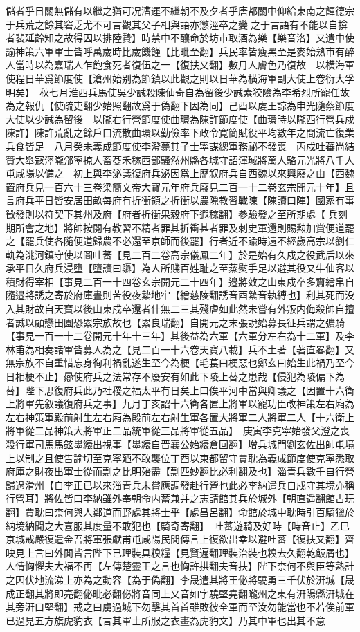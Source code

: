 儲者乎日關無儲有以繼之猶可况漕運不繼朝不及夕者乎唐都關中仰給東南之餫德宗于兵荒之餘其窘乏尤不可言觀其父子相與語亦懲涇卒之變之于言語有不能以自揜者裴延齡知之故得因以排陸贄】時禁中不釀命於坊市取酒為樂【樂音洛】又遣中使諭神策六軍軍士皆呼萬歲時比歲饑饉【比毗至翻】兵民率皆瘦黑至是麥始熟市有醉人當時以為嘉瑞人乍飽食死者復伍之一【復扶又翻】數月人膚色乃復故　以横海軍使程日華爲節度使【滄州始别為節鎮以此觀之則以日華為横海軍副大使上卷衍大孚明矣】　秋七月淮西兵馬使吳少誠殺陳仙奇自為留後少誠素狡險為李希烈所寵任故為之報仇【使疏吏翻少始照翻故爲于偽翻下因為同】己酉以䖍王諒為申光隨蔡節度大使以少誠為留後　以隴右行營節度使曲環為陳許節度使【曲環時以隴西行營兵戍陳許】陳許荒亂之餘戶口流散曲環以勤儉率下政令寛簡賦役平均數年之間流亡復業兵食皆足　八月癸未義成節度使李澄薨其子士寜謀總軍務祕不發喪　丙戍吐蕃尚結贊大舉寇涇隴邠寜掠人畜芟禾稼西鄙騷然州縣各城守詔渾瑊將萬人駱元光將八千人屯咸陽以備之　初上與李泌議復府兵泌因爲上歷叙府兵自西魏以來興廢之由【西魏置府兵見一百六十三卷梁簡文帝大寶元年府兵廢見二百一十二卷玄宗開元十年】且言府兵平日皆安居田畝每府有折衝領之折衝以農隙教習戰陳【陳讀曰陣】國家有事徵發則以符契下其州及府【府者折衝果毅府下遐稼翻】參驗發之至所期處【兵刻期所會之地】將帥按閱有教習不精者罪其折衝甚者罪及刺史軍還則賜勲加賞便道罷之【罷兵使各隨便道歸農不必還至京師而後罷】行者近不踰時遠不經歲高宗以劉仁軌為洮河鎮守使以圖吐蕃【見二百二卷高宗儀鳳二年】於是始有久戍之役武后以來承平日久府兵浸墮【墮讀曰隳】為人所賤百姓耻之至蒸熨手足以避其役又牛仙客以積財得宰相【事見二百一十四卷玄宗開元二十四年】邉將效之山東戍卒多齎繒帛自隨邉將誘之寄於府庫晝則苦役夜縶地牢【繒慈陵翻誘音酉縶音執縛也】利其死而没入其財故自天寶以後山東戍卒還者什無二三其殘虐如此然未嘗有外叛内侮殺帥自擅者誠以顧戀田園恐累宗族故也【累良瑞翻】自開元之末張說始募長征兵謂之彍騎【事見一百一十二卷開元十年十三年】其後益為六軍【六軍分左右為十二軍】及李林甫為相奏諸軍皆募人為之【見二百一十六卷天寶八載】兵不土著【著直畧翻】又無宗族不自重惜忘身徇利禍亂遂生至今為梗【毛萇曰梗惡也鄭玄曰始生此禍乃至今日相梗不止】曏使府兵之法常存不廢安有如此下陵上替之患哉【侵犯為陵偏下為替】陛下思復府兵此乃社稷之福太平有日矣上曰俟平河中當與卿議之【因置十六衛上將軍先叙議復府兵之事】九月丁亥詔十六衛各置上將軍以寵功臣改神策左右廂為左右神策軍殿前射生左右廂為殿前左右射生軍各置大將軍二人將軍二人【十六衛上將軍從二品神策大將軍正二品統軍從三品將軍從五品】　庚寅李克寜始發父澄之喪殺行軍司馬馬鉉墨縗出視事【墨縗自晋襄公始縗倉回翻】增兵城門劉玄佐出師屯境上以制之且使告諭切至克寜廼不敢襲位丁酉以東都留守賈耽為義成節度使克寜悉取府庫之財夜出軍士從而剽之比明殆盡【剽匹妙翻比必利翻及也】淄青兵數千自行營歸過滑州【自李正已以來淄青兵未嘗應調發赴行營也此必李納遣兵自戍守其境亦稱行營耳】將佐皆曰李納雖外奉朝命内蓄兼并之志請館其兵於城外【朝直遥翻館古玩翻】賈耽曰柰何與人鄰道而野處其將士乎【處昌呂翻】命館於城中耽時引百騎獵於納境納聞之大喜服其度量不敢犯也【騎奇寄翻】　吐蕃遊騎及好畤【畤音止】乙巳京城戒嚴復遣金吾將軍張獻甫屯咸陽民閒傳言上復欲出幸以避吐蕃【復扶又翻】齊映見上言曰外閒皆言陛下已理裝具糗糧【見賢遍翻理裝治裝也糗去久翻乾飯屑也】人情恟懼夫大福不再【左傳楚靈王之言也恟許拱翻夫音扶】陛下柰何不與臣等熟計之因伏地流涕上亦為之動容【為于偽翻】李晟遣其將王佖將驍勇三千伏於汧城【晟成正翻其將即亮翻佖毗必翻佖將音同上又音如字驍堅堯翻隴州之東有汧陽縣汧城在其旁汧口堅翻】戒之曰虜過城下勿擊其首首雖敗彼全軍而至汝勿能當也不若俟前軍已過見五方旗虎豹衣【言其軍士所服之衣畫為虎豹文】乃其中軍也出其不意
